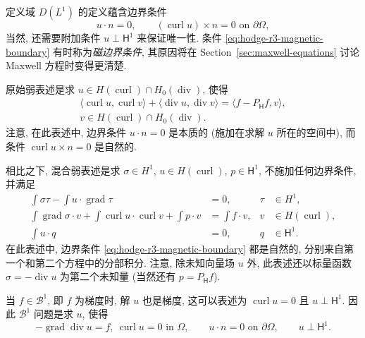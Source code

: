 定义域 $D(L^1)$ 的定义蕴含边界条件
\begin{equation}\label{eq:hodge-r3-magnetic-boundary}
u\cdot n=0,\qquad(\operatorname{curl}u)\times n=0\text{ on }\partial\Omega,
\end{equation}
当然, 还需要附加条件 $u\perp\mathsf H^1$ 来保证唯一性. 条件 \eqref{eq:hodge-r3-magnetic-boundary} 有时称为\emph{磁边界条件}, 其原因将在 Section~\ref{sec:maxwell-equations} 讨论 Maxwell 方程时变得更清楚.

原始弱表述是求 $u\in H(\operatorname{curl})\cap H_{0}(\operatorname{div})$, 使得
\begin{equation}\label{eq:hodge-r3-magnetic-primal}
\begin{gathered}
\langle\operatorname{curl}u,\operatorname{curl}v\rangle+\langle\operatorname{div}u,\operatorname{div}v\rangle=\langle f-P_{\mathsf H}f,v\rangle,\\
v\in H(\operatorname{curl})\cap H_{0}(\operatorname{div}).
\end{gathered}
\end{equation}
注意, 在此表述中, 边界条件 $u\cdot n=0$ 是本质的 (施加在求解 $u$ 所在的空间中), 而条件 $\operatorname{curl}u\times n=0$ 是自然的.

相比之下, 混合弱表述是求 $\sigma\in H^1$, $u\in H(\operatorname{curl})$, $p\in\mathsf H^1$, 不施加任何边界条件, 并满足
\begin{equation}\label{eq:hodge-r3-magnetic-mixed}
\begin{aligned}
\int\sigma\tau-\int u\cdot\operatorname{grad}\tau&=0,&\tau&\in H^1,\\
\int\operatorname{grad}\sigma\cdot v+\int\operatorname{curl}u\cdot\operatorname{curl}v+\int p\cdot v&=\int f\cdot v,&v&\in H(\operatorname{curl}),\\
\int u\cdot q&=0,&q&\in\mathsf H^1.
\end{aligned}
\end{equation}
在此表述中, 边界条件 \eqref{eq:hodge-r3-magnetic-boundary} 都是自然的, 分别来自第一个和第二个方程中的分部积分. 注意, 除未知向量场 $u$ 外, 此表述还以标量函数 $\sigma=-\operatorname{div}u$ 为第二个未知量 (当然还有 $p=P_{\mathsf H}f$).

当 $f\in\mathcal B^1$, 即 $f$ 为梯度时, 解 $u$ 也是梯度, 这可以表述为 $\operatorname{curl}u=0$ 且 $u\perp\mathsf H^1$. 因此 $\mathcal B^1$ 问题是求 $u$, 使得
\[
-\operatorname{grad}\operatorname{div}u=f,\ \operatorname{curl}u=0\text{ in }\Omega,\qquad u\cdot n=0\text{ on }\partial\Omega,\qquad u\perp\mathsf H^1.
\]

